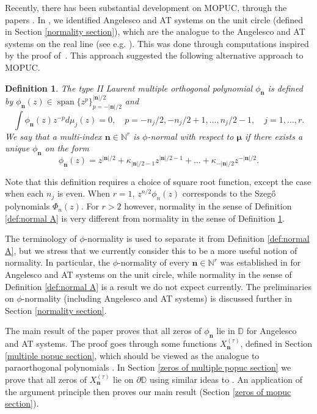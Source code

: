 \documentclass[reqno,centertags,11pt,draft]{amsart}
\newtheorem{defn}[thm]{Definition}
\newcommand{\N}{\mathbb{N}}
\newcommand{\D}{\mathbb{D}}
\renewcommand{\d}{\partial}
\newcommand{\abs}[1]{\left|#1\right|}
\begin{document}
Recently, there has been substantial development on MOPUC, through the papers \cite{KVMOPUC,HueMan,KVHP,KNik,KVMLOPUC}. In \cite{KVMLOPUC}, we identified Angelesco and AT systems on the unit circle (defined in Section \ref{normality section}), which are the analogue to the Angelesco and AT systems on the real line (see e.g. \cite{bookNS}). This was done through computations inspired by the proof of~\cite{Kui}. This approach suggested the following alternative approach to MOPUC. 
\begin{defn}\label{def:normal B}
The type II Laurent multiple orthogonal polynomial $\phi_{\bm{n}}$ is defined by $\phi_{\bm{n}}(z) \in \operatorname{span}\{z^p\}_{p = -\abs{\bm{n}}/2}^{\abs{\bm{n}}/2}$ and 
\begin{equation}\label{eq:type II def mod}
    \int \phi_{\bm{n}}(z)z^{-p}d\mu_j(z) = 0, \quad p = -n_j/2,-n_j/2+1,\ldots,n_j/2-1, \quad j = 1,\dots,r.
\end{equation}
We say that a multi-index $\bm{n}\in\N^r$ is $\phi$-normal with respect to $\bm{\mu}$ if there exists a unique $\phi_{\bm{n}}$ on the form 
\begin{equation}\label{eq:monic type II mod}
    \phi_{\bm{n}}(z) = z^{\abs{\bm{n}}/2} + \kappa_{\abs{\bm{n}}/2-1}z^{\abs{\bm{n}}/2-1} + \ldots + \kappa_{-\abs{\bm{n}}/2}z^{-\abs{\bm{n}}/2}.
\end{equation}
\end{defn}
Note that this definition requires a choice of square root function, except the case when each $n_j$ is even. %
When $r = 1$, $z^{n/2}\phi_{n}(z)$ corresponds to the Szeg\H{o} polynomials $\Phi_{n}(z)$. For $r > 2$ however, normality in the sense of Definition \ref{def:normal A} is very different from normality in the sense of Definition \ref{def:normal B}. 

The terminology of $\phi$-normality is used to separate it from Definition \ref{def:normal A}, but we stress that we currently consider this to be a more useful notion of normality. In particular, the $\phi$-normality of every $\bm{n}\in\N^r$ was established in \cite{KVMLOPUC} for Angelesco and AT systems on the unit circle, while normality in the sense of Definition \ref{def:normal A} is a result we do not expect currently. The preliminaries on $\phi$-normality (including Angelesco and AT systems) is discussed further in Section \ref{normality section}. 

The main result of the paper proves that all zeros of $\phi_{\bm{n}}$ lie in $\D$ for Angelesco and AT systems. The proof goes through some functions $X_{\bm{n}}^{(\tau)}$, defined in Section \ref{multiple popuc section}, which should be viewed as the analogue to paraorthogonal polynomials \cite{JNT}. In Section \ref{zeros of multiple popuc section} we prove that all zeros of $X_{\bm{n}}^{(\tau)}$ lie on $\d\D$ using similar ideas to \cite{KVNikInt}. An application of the argument principle then proves our main result (Section \ref{zeros of mopuc section}). 
\end{document}
